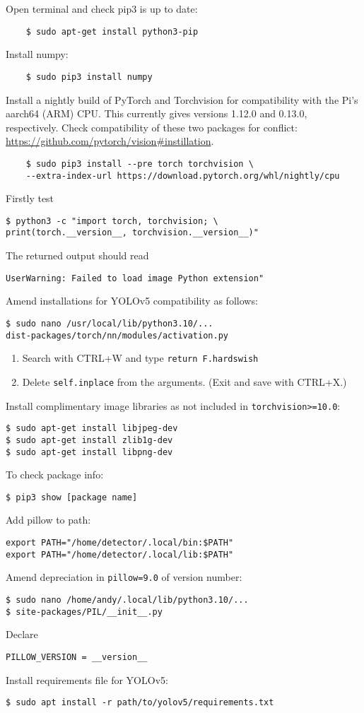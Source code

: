 \documentclass[12pt, a4paper, oneside]{article}
\begin{document}
Open terminal and check pip3 is up to date:
\begin{verbatim}
	$ sudo apt-get install python3-pip 
\end{verbatim}
Install numpy:
\begin{verbatim}
	$ sudo pip3 install numpy
\end{verbatim}
Install a nightly build of PyTorch and Torchvision for compatibility with the Pi's aarch64 (ARM) CPU. This currently gives versions 1.12.0 and 0.13.0, respectively. Check compatibility of these two packages for conflict: \url{https://github.com/pytorch/vision#instillation}.
\begin{verbatim}
	$ sudo pip3 install --pre torch torchvision \
	--extra-index-url https://download.pytorch.org/whl/nightly/cpu
\end{verbatim}
Firstly test
\begin{verbatim}
$ python3 -c "import torch, torchvision; \
print(torch.__version__, torchvision.__version__)"
\end{verbatim}
The returned output should read
\begin{verbatim}
UserWarning: Failed to load image Python extension"
\end{verbatim}
Amend installations for YOLOv5 compatibility as follows:
\begin{verbatim}
$ sudo nano /usr/local/lib/python3.10/...
dist-packages/torch/nn/modules/activation.py
\end{verbatim}
\begin{enumerate}
\item
Search with CTRL+W and type \texttt{return F.hardswish}
\item
Delete \texttt{self.inplace} from the arguments. (Exit and save with CTRL+X.)
\end{enumerate}
Install complimentary image libraries as not included in \texttt{torchvision>=10.0}:
\begin{verbatim}
$ sudo apt-get install libjpeg-dev
$ sudo apt-get install zlib1g-dev
$ sudo apt-get install libpng-dev
\end{verbatim}
To check package info:
\begin{verbatim}
$ pip3 show [package name]
\end{verbatim}
Add pillow to path:
\begin{verbatim}
export PATH="/home/detector/.local/bin:$PATH"
export PATH="/home/detector/.local/lib:$PATH"
\end{verbatim}
Amend depreciation in \texttt{pillow=9.0} of version number:
\begin{verbatim}
$ sudo nano /home/andy/.local/lib/python3.10/...
$ site-packages/PIL/__init__.py
\end{verbatim}
Declare
\begin{verbatim}
PILLOW_VERSION = __version__
\end{verbatim}
Install requirements file for YOLOv5:
\begin{verbatim}
$ sudo apt install -r path/to/yolov5/requirements.txt
\end{verbatim}
\end{document}
